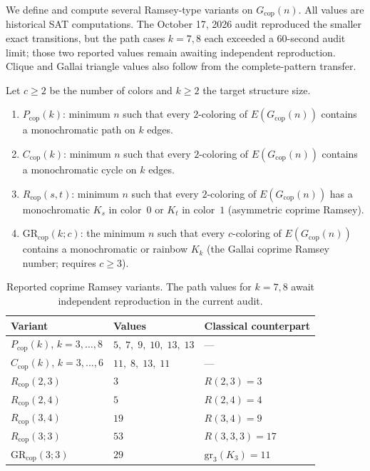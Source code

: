 \documentclass[12pt]{article}
\newcommand{\Rcop}{R_{\mathrm{cop}}}
\newcommand{\Pcop}{P_{\mathrm{cop}}}
\newcommand{\Ccop}{C_{\mathrm{cop}}}
\newcommand{\GRcop}{\mathrm{GR}_{\mathrm{cop}}}
\newcommand{\Gcop}{G_{\mathrm{cop}}}
\begin{document}
We define and compute several Ramsey-type variants on $\Gcop(n)$. All
values are historical SAT computations. The October 17, 2026 audit
reproduced the smaller exact transitions, but the path cases $k=7,8$
each exceeded a $60$-second audit limit; those two reported values
remain awaiting independent reproduction. Clique and Gallai triangle
values also follow from the complete-pattern transfer.

\begin{definition}\label{def:variants}
Let $c\ge 2$ be the number of colors and $k\ge 2$ the target structure
size.
\begin{enumerate}
\item $\Pcop(k)$: minimum $n$ such that every $2$-coloring of
  $E(\Gcop(n))$ contains a monochromatic path on $k$ edges.
\item $\Ccop(k)$: minimum $n$ such that every $2$-coloring of
  $E(\Gcop(n))$ contains a monochromatic cycle on $k$ edges.
\item $\Rcop(s,t)$: minimum $n$ such that every $2$-coloring of
  $E(\Gcop(n))$ has a monochromatic $K_s$ in color~$0$ or $K_t$ in
  color~$1$ (asymmetric coprime Ramsey).
\item $\GRcop(k;c)$: the minimum $n$ such that every $c$-coloring of
  $E(\Gcop(n))$ contains a monochromatic or rainbow $K_k$ (the Gallai
  coprime Ramsey number; requires $c\ge 3$).
\end{enumerate}
\end{definition}

\begin{table}[ht]
\centering
\caption{Reported coprime Ramsey variants. The path values for $k=7,8$
await independent reproduction in the current audit.}\label{tab:variants}
\medskip
\begin{tabular}{@{}lll@{}}
\toprule
\textbf{Variant} & \textbf{Values} & \textbf{Classical counterpart} \\
\midrule
$\Pcop(k)$, $k=3,\ldots,8$ & $5,\; 7,\; 9,\; 10,\; 13,\; 13$ & --- \\[3pt]
$\Ccop(k)$, $k=3,\ldots,6$ & $11,\; 8,\; 13,\; 11$ & --- \\[3pt]
$\Rcop(2,3)$ & $3$ & $R(2,3) = 3$ \\
$\Rcop(2,4)$ & $5$ & $R(2,4) = 4$ \\
$\Rcop(3,4)$ & $19$ & $R(3,4) = 9$ \\[3pt]
$\Rcop(3;3)$ & $53$ & $R(3,3,3) = 17$ \\[3pt]
$\GRcop(3;3)$ & $29$ & $\mathrm{gr}_3(K_3) = 11$ \\
\bottomrule
\end{tabular}
\end{table}
\end{document}
